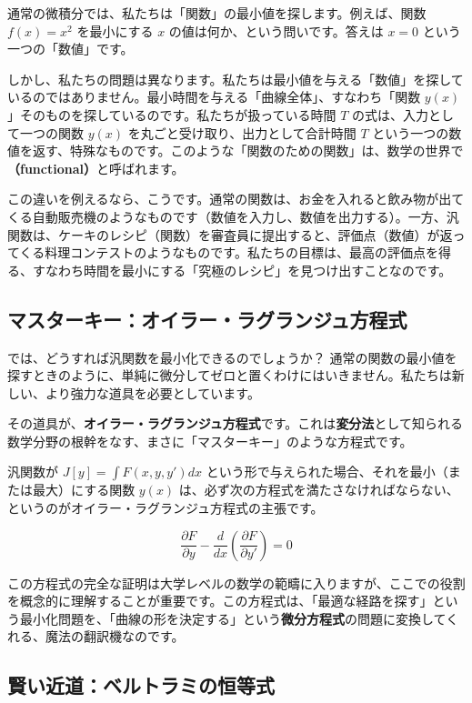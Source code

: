 \documentclass[12pt,a4paper]{ltjsarticle}
\begin{document}
通常の微積分では、私たちは「関数」の最小値を探します。例えば、関数 $f(x) = x^2$ を最小にする $x$ の値は何か、という問いです。答えは $x=0$ という一つの「数値」です。

しかし、私たちの問題は異なります。私たちは最小値を与える「数値」を探しているのではありません。最小時間を与える「曲線全体」、すなわち「関数 $y(x)$」そのものを探しているのです。私たちが扱っている時間 $T$ の式は、入力として一つの関数 $y(x)$ を丸ごと受け取り、出力として合計時間 $T$ という一つの数値を返す、特殊なものです。このような「関数のための関数」は、数学の世界で\textbf{（functional）}と呼ばれます。

この違いを例えるなら、こうです。通常の関数は、お金を入れると飲み物が出てくる自動販売機のようなものです（数値を入力し、数値を出力する）。一方、汎関数は、ケーキのレシピ（関数）を審査員に提出すると、評価点（数値）が返ってくる料理コンテストのようなものです。私たちの目標は、最高の評価点を得る、すなわち時間を最小にする「究極のレシピ」を見つけ出すことなのです。

\subsection{マスターキー：オイラー・ラグランジュ方程式}

では、どうすれば汎関数を最小化できるのでしょうか？ 通常の関数の最小値を探すときのように、単純に微分してゼロと置くわけにはいきません。私たちは新しい、より強力な道具を必要としています。

その道具が、\textbf{オイラー・ラグランジュ方程式}です。これは\textbf{変分法}として知られる数学分野の根幹をなす、まさに「マスターキー」のような方程式です。

汎関数が $J[y] = \int F(x, y, y') dx$ という形で与えられた場合、それを最小（または最大）にする関数 $y(x)$ は、必ず次の方程式を満たさなければならない、というのがオイラー・ラグランジュ方程式の主張です。

\begin{equation}
\frac{\partial F}{\partial y} - \frac{d}{dx}\left(\frac{\partial F}{\partial y'}\right) = 0
\end{equation}

この方程式の完全な証明は大学レベルの数学の範疇に入りますが、ここでの役割を概念的に理解することが重要です。この方程式は、「最適な経路を探す」という最小化問題を、「曲線の形を決定する」という\textbf{微分方程式}の問題に変換してくれる、魔法の翻訳機なのです。

\subsection{賢い近道：ベルトラミの恒等式}
\end{document}
